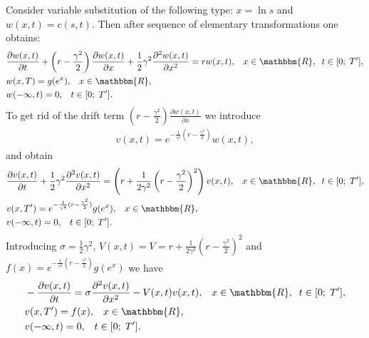 \documentclass[11pt,a4paper]{extarticle}
\begin{document}
Consider variable substitution of the following type: $x=\ln s$ and $w(x,t) = c(s, t)$. Then after sequence of elementary transformations one obtains:
\begin{equation}
	\begin{aligned}
		&\frac{\partial w(x,t)}{\partial t} + \left(r-\frac{\gamma^2}{2}\right) \frac{\partial w(x,t)}{\partial x} + 
		\frac12 \gamma^2 \frac{\partial^2 w(x,t)}{\partial x^2} = rw(x,t),
		\;\;\;x \in \mathbbm{R},\;\; t \in [0;\;T^{\prime}],\\
		&w(x,T) = g(e^x), \;\;\; x \in \mathbbm{R},\\
		&w(-\infty,t) = 0, \;\;\; t \in [0;\;T^{\prime}].
	\end{aligned}
\end{equation}
To get rid of the drift term $\left(r-\frac{\gamma^2}{2}\right) \frac{\partial w(x,t)}{\partial x}$ we introduce
\begin{equation}
	\begin{aligned}
		v(x,t) = e^{-\frac{1}{\gamma^2} (r-\frac{\gamma^2}{2})} w(x,t),
	\end{aligned}
\end{equation}
and obtain
\begin{equation}
	\begin{aligned}
		&\frac{\partial v(x,t)}{\partial t} + \frac12 \gamma^2 \frac{\partial^2 v(x,t)}{\partial x^2} = 
		\left( r +  \frac{1}{2\gamma^2} \left( r-\frac{\gamma^2}{2}\right)^2 \right) v(x,t),
	 	\;\;\;x \in \mathbbm{R},\;\; t \in [0;\;T^{\prime}],\\
		&v(x,T^{\prime}) = e^{-\frac{1}{\gamma^2} (r-\frac{\gamma^2}{2})} g(e^x), \;\;\; x \in \mathbbm{R},\\
		&v(-\infty,t) = 0, \;\;\; t \in [0;\;T^{\prime}].
	\end{aligned}
\end{equation}
Introducing 
$\sigma = \frac12 \gamma^2$, $V(x,t) = V = r +  \frac{1}{2\gamma^2} \left( r-\frac{\gamma^2}{2}\right)^2$ and
$f(x) = e^{-\frac{1}{\gamma^2} (r-\frac{\gamma^2}{2})} g(e^x)$  we have
\begin{equation}
	\begin{aligned}
		&-\frac{\partial v(x,t)}{\partial t} = \sigma \frac{\partial^2 v(x,t)}{\partial x^2} - V(x,t) v(x,t),
		\;\;\;x \in \mathbbm{R},\;\; t \in [0;\;T^{\prime}],\\
		&v(x,T^{\prime}) = f(x), \;\;\; x \in \mathbbm{R},\\
		&v(-\infty,t) = 0, \;\;\; t \in [0;\;T^{\prime}].
	\end{aligned}
\end{equation}
\end{document}

